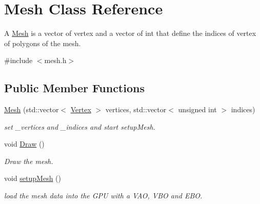 \hypertarget{class_mesh}{}\section{Mesh Class Reference}
\label{class_mesh}


A \mbox{\hyperlink{class_mesh}{Mesh}} is a vector of vertex and a vector of int that define the indices of vertex of polygons of the mesh.  




{\ttfamily \#include $<$mesh.\+h$>$}

\subsection*{Public Member Functions}
\begin{DoxyCompactItemize}
\item 
\mbox{\hyperlink{class_mesh_a9471cc66749be2d05a9e2bdf77090450}{Mesh}} (std\+::vector$<$ \mbox{\hyperlink{class_vertex}{Vertex}} $>$ vertices, std\+::vector$<$ unsigned int $>$ indices)
\begin{DoxyCompactList}\small\item\em set \+\_\+vertices and \+\_\+indices and start setup\+Mesh. \end{DoxyCompactList}\item 
\mbox{\label{class_mesh_afdd95c079fd0442afef8a6c421c8bfc9}} 
void \mbox{\hyperlink{class_mesh_afdd95c079fd0442afef8a6c421c8bfc9}{Draw}} ()
\begin{DoxyCompactList}\small\item\em Draw the mesh. \end{DoxyCompactList}\item 
\mbox{\label{class_mesh_aafa4e21067a9b0c4407daf5e3c9ea991}} 
void \mbox{\hyperlink{class_mesh_aafa4e21067a9b0c4407daf5e3c9ea991}{setup\+Mesh}} ()
\begin{DoxyCompactList}\small\item\em load the mesh data into the G\+PU with a V\+AO, V\+BO and E\+BO. \end{DoxyCompactList}\end{DoxyCompactItemize}
